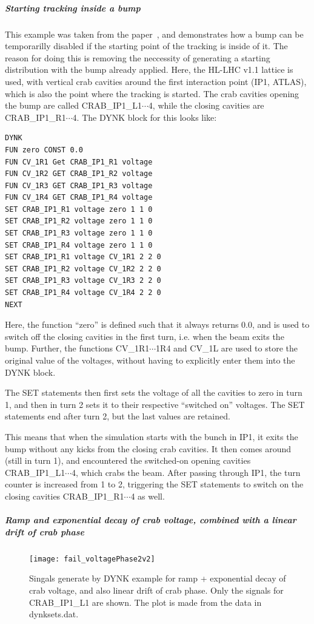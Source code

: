 \documentclass[a4paper,11pt]{report}
\begin{document}
\subparagraph{Starting tracking inside a bump}

This example was taken from the paper~\cite{DYNKpaper}, and demonstrates how a bump can be temporarilly disabled if the starting point of the tracking is inside of it.
The reason for doing this is removing the neccessity of generating a starting distribution with the bump already applied.
Here, the HL-LHC v1.1 lattice is used, with vertical crab cavities around the first interaction point (IP1, ATLAS), which is also the point where the tracking is started.
The crab cavities opening the bump are called CRAB\_IP1\_L1$\cdots$4, while the closing cavities are CRAB\_IP1\_R1$\cdots$4.
The DYNK block for this looks like:
\begin{verbatim}
DYNK
FUN zero CONST 0.0
FUN CV_1R1 Get CRAB_IP1_R1 voltage
FUN CV_1R2 GET CRAB_IP1_R2 voltage
FUN CV_1R3 GET CRAB_IP1_R3 voltage
FUN CV_1R4 GET CRAB_IP1_R4 voltage
SET CRAB_IP1_R1 voltage zero 1 1 0
SET CRAB_IP1_R2 voltage zero 1 1 0
SET CRAB_IP1_R3 voltage zero 1 1 0
SET CRAB_IP1_R4 voltage zero 1 1 0
SET CRAB_IP1_R1 voltage CV_1R1 2 2 0
SET CRAB_IP1_R2 voltage CV_1R2 2 2 0
SET CRAB_IP1_R3 voltage CV_1R3 2 2 0
SET CRAB_IP1_R4 voltage CV_1R4 2 2 0
NEXT
\end{verbatim}

Here, the function ``zero'' is defined such that it always returns 0.0, and is used to switch off the closing cavities in the first turn, i.e. when the beam exits the bump.
Further, the functions CV\_1R1$\cdots$1R4 and CV\_1L are used to store the original value of the voltages, without having to explicitly enter them into the DYNK block.

The SET statements then first sets the voltage of all the cavities to zero in turn 1, and then in turn 2 sets it to their respective ``switched on'' voltages.
The SET statements end after turn 2, but the last values are retained.

This means that when the simulation starts with the bunch in IP1, it exits the bump without any kicks from the closing crab cavities.
It then comes around (still in turn 1), and encountered the switched-on opening cavities CRAB\_IP1\_L1$\cdots$4, which crabs the beam.
After passing through IP1, the turn counter is increased from 1 to 2, triggering the SET statements to switch on the closing cavities CRAB\_IP1\_R1$\cdots$4 as well.

\subparagraph{Ramp and exponential decay of crab voltage, combined with a linear drift of crab phase}
\begin{figure}
  \centering
  \texttt{[image: fail\_voltagePhase2v2]}
  \caption{Singals generate by DYNK example for ramp + exponential decay of crab voltage, and also linear drift of crab phase. Only the signals for CRAB\_IP1\_L1 are shown. The plot is made from the data in dynksets.dat.}
  \label{fig:DYNK_fail}
\end{figure}
\end{document}
